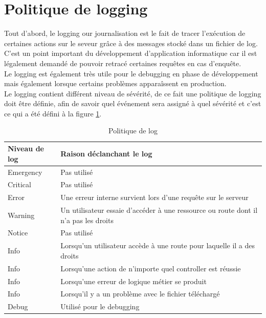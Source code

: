 \documentclass[
    iai, %
    il, %
]{heig-tb}
\begin{document}
\section{Politique de logging}
Tout d'abord, le logging our journalisation est le fait de tracer l'exécution de certaines actions sur le seveur grâce à des messages stocké dans un fichier de log. \\
C'est un point important du développement d'application informatique car il est légalement demandé de pouvoir retracé certaines requêtes en cas d'enquête. \\
Le logging est également très utile pour le debugging en phase de développement mais également lorsque certains problèmes apparaîssent en production. \\
Le logging contient différent niveau de sévérité, de ce fait une politique de logging doit être définie, afin de savoir quel événement sera assigné à quel sévérité et c'est ce qui a été défini à la figure \ref{politique-log}.

\begin{table}[h]
    \begin{center}
        \caption{Politique de log\label{politique-log}}
        \begin{tabularx}{1.0\textwidth} {l|X}
            Niveau de log & Raison déclanchant le log                                                           \\ \hline
            Emergency     & Pas utilisé                                                                         \\
            Critical      & Pas utilisé                                                                         \\
            Error         & Une erreur interne survient lors d'une requête sur le serveur                       \\
            Warning       & Un utilisateur essaie d'accéder à une ressource ou route dont il n'a pas les droits \\
            Notice        & Pas utilisé                                                                         \\
            Info          & Lorsqu'un utilisateur accède à une route pour laquelle il a des droits              \\
            Info          & Lorsqu'une action de n'importe quel controller est réussie                          \\
            Info          & Lorsqu'une erreur de logique métier se produit                                      \\
            Info          & Lorsqu'il y a un problème avec le fichier téléchargé                                \\
            Debug         & Utilisé pour le debugging                                                           \\
        \end{tabularx}
    \end{center}
\end{table}
\end{document}
